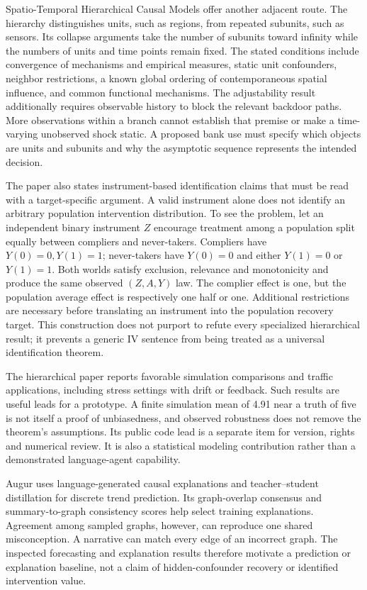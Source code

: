Spatio-Temporal Hierarchical Causal Models offer another adjacent route.
The hierarchy distinguishes units, such as regions, from repeated subunits,
such as sensors. Its collapse arguments take the number of subunits toward
infinity while the numbers of units and time points remain fixed. The
stated conditions include convergence of mechanisms and empirical measures,
static unit confounders, neighbor restrictions, a known global ordering of
contemporaneous spatial influence, and common functional mechanisms. The
adjustability result additionally requires observable history to block the
relevant backdoor paths. More observations within a branch cannot establish
that premise or make a time-varying unobserved shock static. A proposed bank
use must specify which objects are units and subunits and why the asymptotic
sequence represents the intended decision.
\citep{exec15_latent_sthcm}

The paper also states instrument-based identification claims that must be
read with a target-specific argument. A valid instrument alone does not
identify an arbitrary population intervention distribution. To see the
problem, let an independent binary instrument $Z$ encourage treatment among
a population split equally between compliers and never-takers. Compliers
have $Y(0)=0,Y(1)=1$; never-takers have $Y(0)=0$ and either $Y(1)=0$ or
$Y(1)=1$. Both worlds satisfy exclusion, relevance and monotonicity and
produce the same observed $(Z,A,Y)$ law. The complier effect is one, but
the population average effect is respectively one half or one. Additional
restrictions are necessary before translating an instrument into the
population recovery target. This construction does not purport to refute
every specialized hierarchical result; it prevents a generic IV sentence
from being treated as a universal identification theorem.
\citep{exec15_latent_sthcm,exec15_latent_exact}

The hierarchical paper reports favorable simulation comparisons and traffic
applications, including stress settings with drift or feedback. Such results
are useful leads for a prototype. A finite simulation mean of 4.91 near a
truth of five is not itself a proof of unbiasedness, and observed robustness
does not remove the theorem's assumptions. Its public code lead is a
separate item for version, rights and numerical review. It is also a
statistical modeling contribution rather than a demonstrated language-agent
capability.
\citep{exec15_latent_sthcm}

Augur uses language-generated causal explanations and teacher--student
distillation for discrete trend prediction. Its graph-overlap consensus and
summary-to-graph consistency scores help select training explanations.
Agreement among sampled graphs, however, can reproduce one shared
misconception. A narrative can match every edge of an incorrect graph.
The inspected forecasting and explanation results therefore motivate a
prediction or explanation baseline, not a claim of hidden-confounder
recovery or identified intervention value.
\citep{exec13_census_augur_arxiv}

